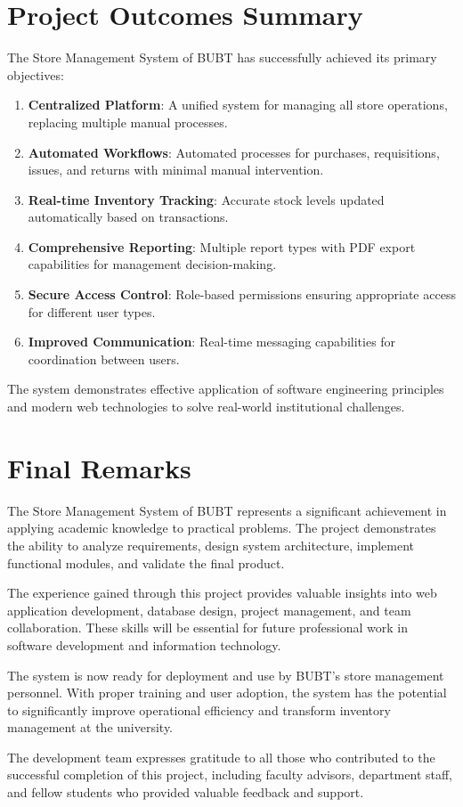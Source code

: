 \section{Project Outcomes Summary}

The Store Management System of BUBT has successfully achieved its primary objectives:

\begin{enumerate}
    \item \textbf{Centralized Platform}: A unified system for managing all store operations, replacing multiple manual processes.

    \item \textbf{Automated Workflows}: Automated processes for purchases, requisitions, issues, and returns with minimal manual intervention.

    \item \textbf{Real-time Inventory Tracking}: Accurate stock levels updated automatically based on transactions.

    \item \textbf{Comprehensive Reporting}: Multiple report types with PDF export capabilities for management decision-making.

    \item \textbf{Secure Access Control}: Role-based permissions ensuring appropriate access for different user types.

    \item \textbf{Improved Communication}: Real-time messaging capabilities for coordination between users.
\end{enumerate}

The system demonstrates effective application of software engineering principles and modern web technologies to solve real-world institutional challenges.

\section{Final Remarks}

The Store Management System of BUBT represents a significant achievement in applying academic knowledge to practical problems. The project demonstrates the ability to analyze requirements, design system architecture, implement functional modules, and validate the final product.

The experience gained through this project provides valuable insights into web application development, database design, project management, and team collaboration. These skills will be essential for future professional work in software development and information technology.

The system is now ready for deployment and use by BUBT's store management personnel. With proper training and user adoption, the system has the potential to significantly improve operational efficiency and transform inventory management at the university.

The development team expresses gratitude to all those who contributed to the successful completion of this project, including faculty advisors, department staff, and fellow students who provided valuable feedback and support.